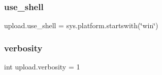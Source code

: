 \subsubsection{\texorpdfstring{use\+\_\+shell}{use\_shell}}
{\footnotesize\ttfamily upload.\+use\+\_\+shell = sys.\+platform.\+startswith(\char`\"{}win\char`\"{})}

\mbox{\label{namespaceupload_a79aff46409a98c4e5f608c8df1fd4612}} 
\subsubsection{\texorpdfstring{verbosity}{verbosity}}
{\footnotesize\ttfamily int upload.\+verbosity = 1}

